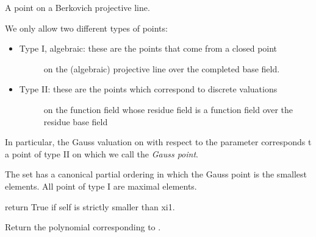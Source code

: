 \documentclass[letterpaper,10pt,english]{sphinxmanual}
\begin{document}
\begin{fulllineitems}
\label{berkovich_line:mclf.berkovich.berkovich_line.PointOnBerkovichLine}
A point on a Berkovich projective line.

We only allow two different types of points:
\begin{itemize}
\item {} \begin{description}
\item[{Type I, algebraic: these are the points that come from a closed point}] \leavevmode
on the (algebraic) projective line over the completed base field.

\end{description}

\item {} \begin{description}
\item[{Type II: these are the points which correspond to discrete valuations}] \leavevmode
on the function field whose residue field is a function field over the
residue base field

\end{description}

\end{itemize}

In particular, the Gauss valuation on  with respect to the parameter
 corresponds t a point  of type II on  which we call
the \emph{Gauss point}.

The set  has a canonical partial ordering in which the Gauss point
is the smallest elements. All point of type I are maximal elements.

\begin{fulllineitems}
\label{berkovich_line:mclf.berkovich.berkovich_line.PointOnBerkovichLine.is_strictly_less}
return True if self is strictly smaller than xi1.

\end{fulllineitems}


\begin{fulllineitems}
\label{berkovich_line:mclf.berkovich.berkovich_line.PointOnBerkovichLine.make_polynomial}
Return the polynomial corresponding to .


\end{fulllineitems}
\end{fulllineitems}
\end{document}

